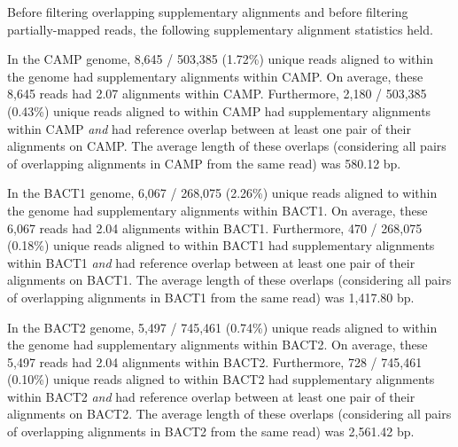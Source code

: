 Before filtering overlapping supplementary alignments and before filtering
partially-mapped reads, the following supplementary alignment statistics held.

In the CAMP genome, 8,645 / 503,385 (1.72\%) unique reads aligned to within the genome had supplementary alignments within CAMP.
On average, these 8,645 reads had 2.07 alignments within CAMP.
Furthermore, 2,180 / 503,385 (0.43\%) unique reads aligned to within CAMP had supplementary alignments within CAMP \emph{and} had reference overlap between at least one pair of their alignments on CAMP.
The average length of these overlaps (considering all pairs of overlapping alignments in CAMP from the same read) was 580.12 bp.

In the BACT1 genome, 6,067 / 268,075 (2.26\%) unique reads aligned to within the genome had supplementary alignments within BACT1.
On average, these 6,067 reads had 2.04 alignments within BACT1.
Furthermore, 470 / 268,075 (0.18\%) unique reads aligned to within BACT1 had supplementary alignments within BACT1 \emph{and} had reference overlap between at least one pair of their alignments on BACT1.
The average length of these overlaps (considering all pairs of overlapping alignments in BACT1 from the same read) was 1,417.80 bp.

In the BACT2 genome, 5,497 / 745,461 (0.74\%) unique reads aligned to within the genome had supplementary alignments within BACT2.
On average, these 5,497 reads had 2.04 alignments within BACT2.
Furthermore, 728 / 745,461 (0.10\%) unique reads aligned to within BACT2 had supplementary alignments within BACT2 \emph{and} had reference overlap between at least one pair of their alignments on BACT2.
The average length of these overlaps (considering all pairs of overlapping alignments in BACT2 from the same read) was 2,561.42 bp.
\endinput